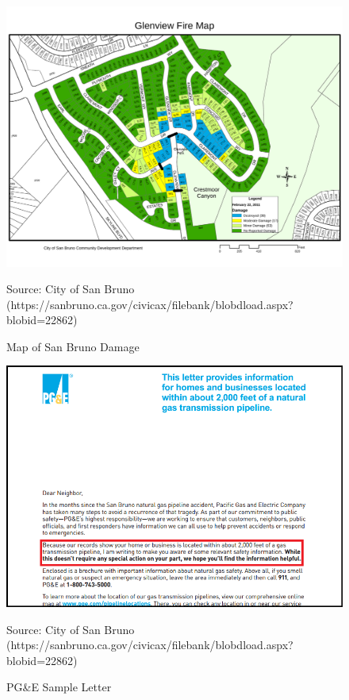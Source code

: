 \documentclass[12pt]{article}
\begin{document}
\begin{figure}[H]
\caption{Map of San Bruno Damage\label{fig:sanbruno}}
\begin{centering}
\includegraphics[width=1\textwidth]{../images/SanBrunoFireMap.pdf}
\par\end{centering}
\centering{}\footnotesize Source: City of San Bruno (https://sanbruno.ca.gov/civicax/filebank/blobdload.aspx?blobid=22862)
\end{figure}

\begin{figure}[H]
\caption{PG\&E Sample Letter\label{fig:letter}}
\begin{centering}
\includegraphics[width=1\textwidth]{../images/PGE_letter.png}
\par\end{centering}
\centering{}\footnotesize Source: City of San Bruno (https://sanbruno.ca.gov/civicax/filebank/blobdload.aspx?blobid=22862)
\end{figure}
\end{document}
